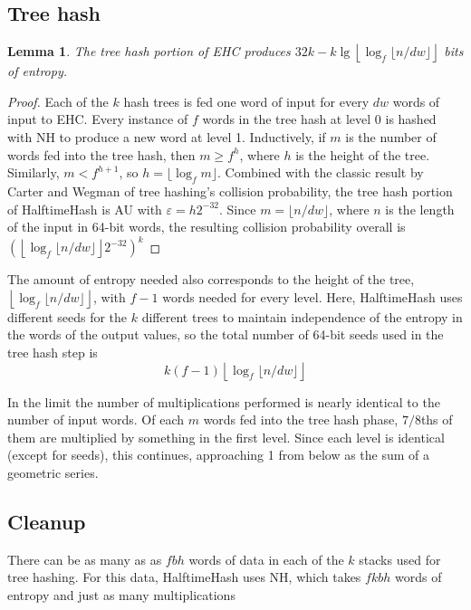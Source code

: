 \documentclass[sigconf, nonacm]{acmart}
\newtheorem*{lemma}{Lemma}
\begin{document}
\subsection{Tree hash}

\begin{lemma}
The tree hash portion of EHC produces $32k - k\lg\left\lfloor\log_f \lfloor n/dw\rfloor\right\rfloor$ bits of entropy.
\end{lemma}
\begin{proof}
Each of the $k$ hash trees is fed one word of input for every $dw$ words of input to EHC.
Every instance of $f$ words in the tree hash at level 0 is hashed with NH to produce a new word at level 1.
Inductively, if $m$ is the number of words fed into the tree hash, then $m \geq f^h$, where $h$ is the height of the tree.
Similarly, $m < f^{h+1}$, so $h = \lfloor \log_f m \rfloor$.
Combined with the classic result by Carter and Wegman of tree hashing's collision probability, the tree hash portion of HalftimeHash is AU with $\varepsilon = h 2^{-32}$.
Since $m = \lfloor n / d w \rfloor$, where $n$ is the length of the input in 64-bit words, the resulting collision probability overall is $\left(\left\lfloor \log_f \lfloor n / d w \rfloor \right\rfloor 2^{-32}\right)^k$
\end{proof}

The amount of entropy needed also corresponds to the height of the tree, $\left\lfloor\log_f \lfloor n/dw\rfloor\right\rfloor$, with $f - 1$ words needed for every level.
Here, HalftimeHash uses different seeds for the $k$ different trees to maintain independence of the entropy in the words of the output values, so the total number of 64-bit seeds used in the tree hash step is \[k(f-1)\left\lfloor\log_f \lfloor n/dw\rfloor\right\rfloor\]

In the limit the number of multiplications performed is nearly identical to the number of input words.
Of each $m$ words fed into the tree hash phase, $7/8$ths of them are multiplied by something in the first level.
Since each level is identical (except for seeds), this continues, approaching 1 from below as the sum of a geometric series.

\subsection{Cleanup}

There can be as many as as $f b h$ words of data in each of the $k$ stacks used for tree hashing.
For this data, HalftimeHash uses NH, which takes $f k b h$ words of entropy and just as many multiplications
\end{document}
